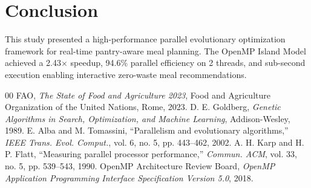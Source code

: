 ﻿\documentclass[conference]{IEEEtran}
\begin{document}
\section{Conclusion}
This study presented a high-performance parallel evolutionary optimization framework for real-time pantry-aware meal planning. The OpenMP Island Model achieved a 2.43$\times$ speedup, 94.6\% parallel efficiency on 2 threads, and sub-second execution enabling interactive zero-waste meal recommendations.

\begin{thebibliography}{00}
 FAO, \textit{The State of Food and Agriculture 2023}, Food and Agriculture Organization of the United Nations, Rome, 2023.
 D. E. Goldberg, \textit{Genetic Algorithms in Search, Optimization, and Machine Learning}, Addison-Wesley, 1989.
 E. Alba and M. Tomassini, ``Parallelism and evolutionary algorithms,'' \textit{IEEE Trans. Evol. Comput.}, vol. 6, no. 5, pp. 443--462, 2002.
 A. H. Karp and H. P. Flatt, ``Measuring parallel processor performance,'' \textit{Commun. ACM}, vol. 33, no. 5, pp. 539--543, 1990.
 OpenMP Architecture Review Board, \textit{OpenMP Application Programming Interface Specification Version 5.0}, 2018.
\end{thebibliography}
\end{document}
